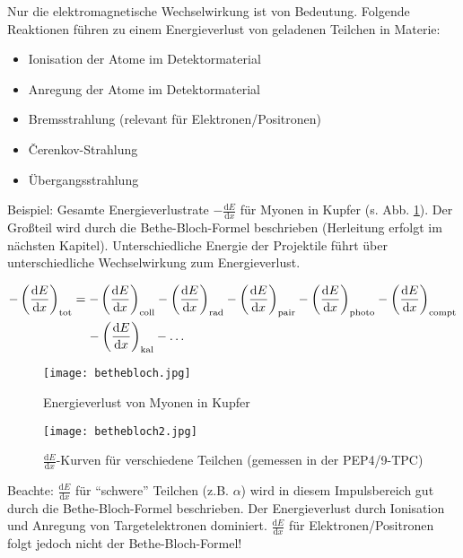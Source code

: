 \FloatBarrier

Nur die elektromagnetische Wechselwirkung ist von Bedeutung. Folgende Reaktionen führen zu einem
Energieverlust von geladenen Teilchen in Materie:

\begin{itemize}
  \item Ionisation der Atome im Detektormaterial
  \item Anregung der Atome im Detektormaterial
  \item Bremsstrahlung (relevant für Elektronen/Positronen)
  \item \v{C}erenkov-Strahlung
  \item Übergangsstrahlung
\end{itemize}
 
 Beispiel: Gesamte Energieverlustrate $-\frac{\mathrm{d}E}{\mathrm{d}x}$ für Myonen in Kupfer (s. Abb.
 \ref{myonenInKupfer}). Der Großteil wird durch die Bethe-Bloch-Formel beschrieben (Herleitung
 erfolgt im nächsten Kapitel).
Unterschiedliche Energie der Projektile führt über unterschiedliche Wechselwirkung zum
Energieverlust.

\begin{align*}
-\left(\frac{\mathrm{d}E}{\mathrm{d}x}\right)_{\text{tot}} &= -\left(\frac{\mathrm{d}E}{\mathrm{d}x}\right)_{\text{coll}}
-\left(\frac{\mathrm{d}E}{\mathrm{d}x}\right)_{\text{rad}} -\left(\frac{\mathrm{d}E}{\mathrm{d}x}\right)_{\text{pair}}
-\left(\frac{\mathrm{d}E}{\mathrm{d}x}\right)_{\text{photo}} -\left(\frac{\mathrm{d}E}{\mathrm{d}x}\right)_{\text{compt}} \\
&\hspace{4mm} -\left(\frac{\mathrm{d}E}{\mathrm{d}x}\right)_{\text{kal}}-\ldots
\end{align*}
 
\begin{figure}
	\centering
	\texttt{[image: bethebloch.jpg]}
 	\caption{Energieverlust von Myonen in Kupfer}
 	\label{myonenInKupfer}
\end{figure}

\begin{figure}
	\centering
	\texttt{[image: bethebloch2.jpg]}
	\caption{$\frac{\mathrm{d}E}{\mathrm{d}x}$-Kurven für verschiedene Teilchen (gemessen in der
	PEP4/9-TPC)}
	\label{}
\end{figure}
 
 Beachte: $\frac{\mathrm{d}E}{\mathrm{d}x}$ für "`schwere"' Teilchen (z.B. $\alpha$) wird in diesem Impulsbereich gut
 durch die Bethe-Bloch-Formel beschrieben. Der Energieverlust durch Ionisation und Anregung von
 Targetelektronen dominiert. $\frac{\mathrm{d}E}{\mathrm{d}x}$ für Elektronen/Positronen folgt jedoch nicht der
 Bethe-Bloch-Formel!
 
 \FloatBarrier